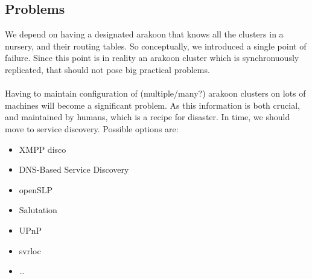 \subsection{Problems}
We depend on having a designated arakoon that knows all the clusters in a nursery, and their routing tables. 
So conceptually, we introduced a single point of failure. 
Since this point is in reality an arakoon cluster which is synchronuously replicated, that should not pose big practical problems.
\paragraph{}
Having to maintain configuration of (multiple/many?) arakoon clusters on lots of machines will become a significant problem. 
As this information is both crucial, and maintained by humans, which is a recipe for disaster. In time, we should move to service discovery. 
Possible options are:
\begin{itemize}
  \item{XMPP disco}
  \item{DNS-Based Service Discovery}
  \item{openSLP}
  \item{Salutation}
  \item{UPnP}
  \item{svrloc}
  \item{\ldots}
\end{itemize}


